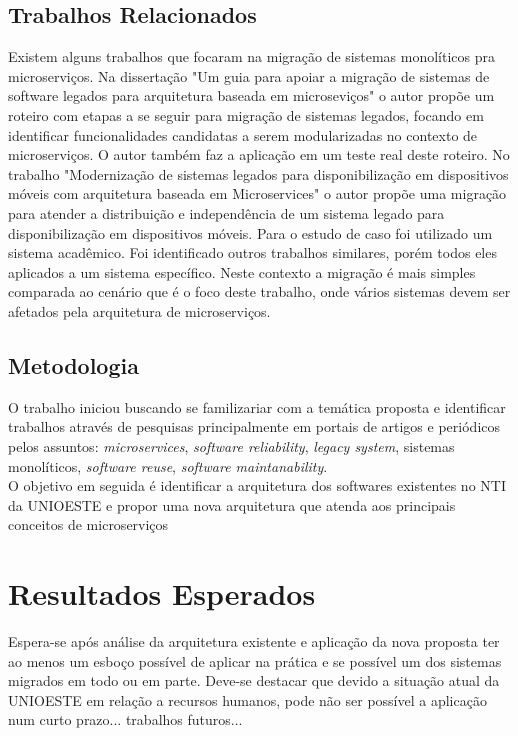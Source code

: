 \documentclass[12pt]{article}
\begin{document}

\subsection{Trabalhos Relacionados}
Existem alguns trabalhos que focaram na migração de sistemas monolíticos pra microserviços.
Na dissertação "Um guia para apoiar a migração de sistemas de software legados para arquitetura baseada em microseviços" o autor propõe um roteiro com etapas a se seguir para migração de sistemas legados, focando em identificar funcionalidades candidatas a serem modularizadas no contexto de microserviços. O autor também faz a aplicação em um teste real deste roteiro.
No trabalho "Modernização de sistemas legados para disponibilização em dispositivos móveis com arquitetura baseada em Microservices" o autor propõe uma migração para atender a distribuição e independência de um sistema legado para disponibilização em dispositivos móveis. Para o estudo de caso foi utilizado um sistema acadêmico.
Foi identificado outros trabalhos similares, porém todos eles aplicados a um sistema específico. Neste contexto a migração é mais simples comparada ao cenário que é o foco deste trabalho, onde vários sistemas devem ser afetados pela arquitetura de microserviços.
\subsection{Metodologia}
O trabalho iniciou buscando se familizariar com a temática proposta e identificar trabalhos através de pesquisas principalmente em portais de artigos e periódicos pelos assuntos: \textit{microservices}, \textit{software reliability}, \textit{legacy system}, sistemas monolíticos, \textit{software reuse}, \textit{software maintanability}.
\\O objetivo em seguida é identificar a arquitetura dos softwares existentes no NTI da UNIOESTE e propor uma nova arquitetura que atenda aos principais conceitos de microserviços
\section{Resultados Esperados}

Espera-se após análise da arquitetura existente e aplicação da nova proposta ter ao menos um esboço possível de aplicar na prática e se possível um dos sistemas migrados em todo ou em parte. Deve-se destacar que devido a situação atual da UNIOESTE em relação a recursos humanos, pode não ser possível a aplicação num curto prazo... trabalhos futuros...
\end{document}
